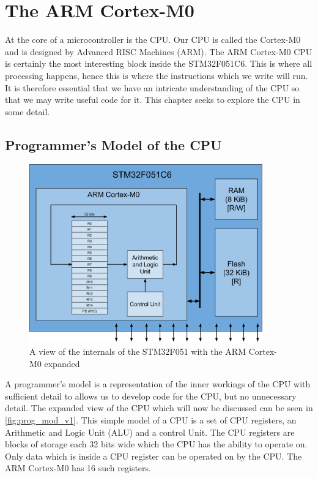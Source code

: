 \chapter{The ARM Cortex-M0}

At the core of a microcontroller is the CPU. Our CPU is called the Cortex-M0 and is designed by Advanced RISC Machines (ARM).
The ARM Cortex-M0 CPU is certainly the most interesting block inside the STM32F051C6. This is where all processing happens, hence this is where the instructions which we write will run. It is therefore essential that we have an intricate understanding of the CPU so that we may write useful code for it. This chapter seeks to explore the CPU in some detail.

\section{Programmer's Model of the CPU}
\begin{figure}[t]
  \centering
  \includegraphics[width=0.9\textwidth]{./week1/programmers_model_v1.pdf}
  \caption{A view of the internals of the STM32F051 with the ARM Cortex-M0 expanded}
  \label{fig:prog_mod_v1}
\end{figure}
A programmer's model is a representation of the inner workings of the CPU with sufficient detail to allows us to develop code for the CPU, but no unnecessary detail. The expanded view of the CPU which will now be discussed can be seen in \autoref{fig:prog_mod_v1}. This simple model of a CPU is a set of CPU registers, an Arithmetic and Logic Unit (ALU) and a control Unit. The CPU registers are blocks of storage each 32 bits wide which the CPU has the ability to operate on. Only data which is inside a CPU register can be operated on by the CPU. The ARM Cortex-M0 has 16 such registers. 

